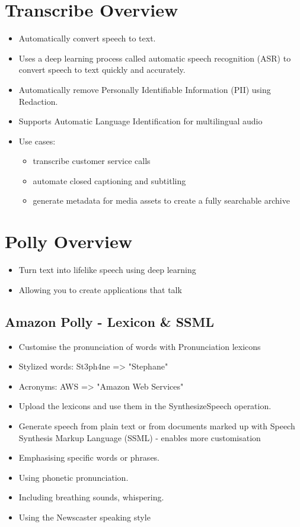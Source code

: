 \section{Transcribe Overview}
\begin{itemize}
    \item Automatically convert speech to text.
    \item Uses a deep learning process called automatic speech recognition (ASR) to convert speech to text quickly and accurately.
    \item Automatically remove Personally Identifiable Information (PII) using Redaction.
    \item Supports Automatic Language Identification for multilingual audio
    \item Use cases:
    \begin{itemize}
        \item transcribe customer service calls
        \item automate closed captioning and subtitling
        \item generate metadata for media assets to create a fully searchable archive
    \end{itemize}
\end{itemize}


\section{Polly Overview}
\begin{itemize}
    \item Turn text into lifelike speech using deep learning
    \item Allowing you to create applications that talk
\end{itemize}

\subsection{Amazon Polly - Lexicon \& SSML}
\begin{itemize}
    \item Customise the pronunciation of words with Pronunciation lexicons
    \item Stylized words: St3ph4ne => "Stephane"
    \item Acronyms: AWS => "Amazon Web Services"
    \item Upload the lexicons and use them in the SynthesizeSpeech operation.
    \item Generate speech from plain text or from documents marked up with Speech Synthesis Markup Language (SSML) - enables more customisation
    \item Emphasising specific words or phrases.
    \item Using phonetic pronunciation.
    \item Including breathing sounds, whispering.
    \item Using the Newscaster speaking style
\end{itemize}


